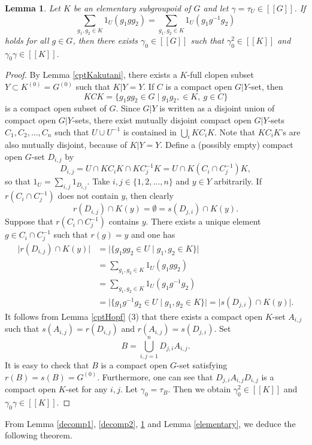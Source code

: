 \documentclass[11pt]{article}
\newtheorem{lem}[thm]{Lemma}
\theoremstyle{definition}
\begin{document}
\begin{lem}\label{decomp3}
Let $K$ be an elementary subgroupoid of $G$ and 
let $\gamma{=}\tau_U\in[[G]]$. 
If 
\[
\sum_{g_1,g_2\in K}1_U(g_1gg_2)
=\sum_{g_1,g_2\in K}1_U(g_1g^{-1}g_2)
\]
holds for all $g\in G$, 
then there exists $\gamma_0\in[[G]]$ such that 
$\gamma_0^2\in[[K]]$ and $\gamma_0\gamma\in[[K]]$. 
\end{lem}
\begin{proof}
By Lemma \ref{cptKakutani}, 
there exists a $K$-full clopen subset $Y\subset K^{(0)}=G^{(0)}$ 
such that $K|Y=Y$. 
If $C$ is a compact open $G|Y$-set, then 
\[
KCK=\{g_1gg_2\in G\mid g_1g_2,\in K,\ g\in C\}
\]
is a compact open subset of $G$. 
Since $G|Y$ is written as a disjoint union of compact open $G|Y$-sets, 
there exist mutually disjoint compact open $G|Y$-sets $C_1,C_2,\dots,C_n$ 
such that $U\cup U^{-1}$ is contained in $\bigcup_iKC_iK$. 
Note that $KC_iK$'s are also mutually disjoint, because of $K|Y=Y$. 
Define a (possibly empty) compact open $G$-set $D_{i,j}$ by 
\[
D_{i,j}=U\cap KC_iK\cap KC_j^{-1}K=U\cap K(C_i\cap C_j^{-1})K, 
\]
so that $1_U=\sum_{i,j}1_{D_{i,j}}$. 
Take $i,j\in\{1,2,\dots,n\}$ and $y\in Y$ arbitrarily. 
If $r(C_i\cap C_j^{-1})$ does not contain $y$, then clearly 
\[
r(D_{i,j})\cap K(y)=\emptyset=s(D_{j,i})\cap K(y). 
\]
Suppose that $r(C_i\cap C_j^{-1})$ contains $y$. 
There exists a unique element $g\in C_i\cap C_j^{-1}$ such that $r(g)=y$ and 
one has 
\begin{align*}
\lvert r(D_{i,j})\cap K(y)\rvert
&=\lvert\{g_1gg_2\in U\mid g_1,g_2\in K\}\rvert \\
&=\sum_{g_1,g_2\in K}1_U(g_1gg_2) \\
&=\sum_{g_1,g_2\in K}1_U(g_1g^{-1}g_2) \\
&=\lvert\{g_1g^{-1}g_2\in U\mid g_1,g_2\in K\}\rvert
=\lvert s(D_{j,i})\cap K(y)\rvert. 
\end{align*}
It follows from Lemma \ref{cptHopf} (3) that 
there exists a compact open $K$-set $A_{i,j}$ 
such that $s(A_{i,j})=r(D_{i,j})$ and $r(A_{i,j})=s(D_{j,i})$. 
Set 
\[
B=\bigcup_{i,j=1}^nD_{j,i}A_{i,j}. 
\]
It is easy to check that 
$B$ is a compact open $G$-set satisfying $r(B)=s(B)=G^{(0)}$. 
Furthermore, one can see that 
$D_{j,i}A_{i,j}D_{i,j}$ is a compact open $K$-set for any $i,j$. 
Let $\gamma_0=\tau_B$. 
Then we obtain $\gamma_0^2\in[[K]]$ and $\gamma_0\gamma\in[[K]]$. 
\end{proof}

From Lemma \ref{decomp1}, \ref{decomp2}, \ref{decomp3} and 
Lemma \ref{elementary}, 
we deduce the following theorem. 
\end{document}
